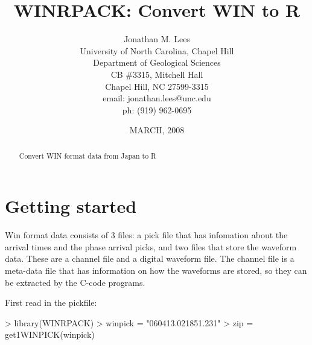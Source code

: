 \documentclass{article}
\begin{document}








\author{Jonathan M. Lees\\
University of North Carolina, Chapel Hill\\
Department of Geological Sciences\\
CB \#3315, Mitchell Hall\\
Chapel Hill, NC  27599-3315\\
email: jonathan.lees@unc.edu\\
ph: (919) 962-0695
}

\title{WINRPACK: Convert WIN to  R}
\date{MARCH, 2008}

\maketitle


\begin{abstract}
Convert WIN format data from Japan to R
\end{abstract}


\section{Getting started}


Win format data consists of 3 files:
a pick file that has infomation about the arrival times
and the phase arrival picks, 
and two files that store the waveform data.
These are 
a channel file and a digital waveform file.
The channel file is a meta-data file that
has information on how the
waveforms are stored, so they can be extracted by the C-code 
programs.

First read in the pickfile:

\begin{Schunk}
\begin{Sinput}
> library(WINRPACK)
> winpick = "060413.021851.231"
> zip = get1WINPICK(winpick)
\end{Sinput}
\end{Schunk}
\end{document}
